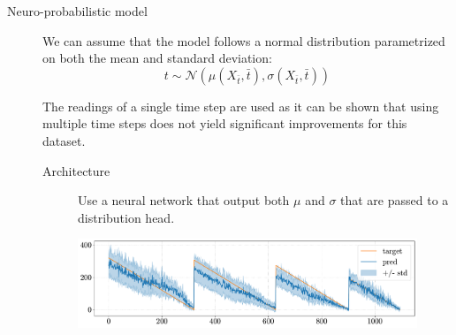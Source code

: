 \begin{description}
    \item[Neuro-probabilistic model]
        We can assume that the model follows a normal distribution parametrized on both the mean and standard deviation:
        \[ t \sim \mathcal{N}(\mu(X_{\bar{t}}, \bar{t}), \sigma(X_{\bar{t}}, \bar{t})) \]

        \begin{remark}
            The readings of a single time step are used as it can be shown that using multiple time steps does not yield significant improvements for this dataset.
        \end{remark}

        \begin{description}
            \item[Architecture]
                Use a neural network that output both $\mu$ and $\sigma$ that are passed to a distribution head.
        \end{description}

        \begin{figure}[H]
            \centering
            \includegraphics[width=0.7\linewidth]{./img/_rul_neuroprobabilistic.pdf}
        \end{figure}
\end{description}





